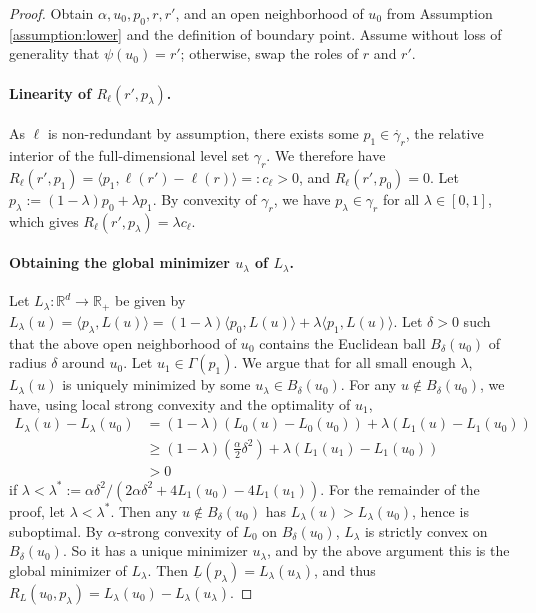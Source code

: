 \documentclass{article}
\theoremstyle{definition}\newtheorem{definition}{Definition}
\theoremstyle{definition}\newtheorem{assumption}{Assumption}
\newcommand{\reals}{\mathbb{R}}
\newcommand{\risk}[1]{\underline{#1}}
\newcommand{\inprod}[2]{\langle #1, #2 \rangle}%
\newcommand{\inter}[1]{\mathring{#1}}%
\begin{document}
\begin{proof}
  Obtain $\alpha, u_0, p_0, r, r'$, and an open neighborhood of $u_0$ from Assumption \ref{assumption:lower} and the definition of boundary point.
  Assume without loss of generality that $\psi(u_0) = r'$; otherwise, swap the roles of $r$ and $r'$.

  \paragraph{Linearity of $R_{\ell}(r',p_{\lambda})$.}
  As $\ell$ is non-redundant by assumption, there exists some $p_1 \in \inter{\gamma_r}$, the relative interior of the full-dimensional level set $\gamma_r$.
  We therefore have $R_\ell(r',p_1) = \inprod{p_1}{\ell(r')-\ell(r)} =: c_\ell > 0$, and $R_\ell(r',p_0) = 0$.
  Let $p_\lambda := (1-\lambda) p_0 + \lambda p_1$.
  By convexity of $\gamma_r$, we have $p_\lambda \in \gamma_r$ for all $\lambda \in [0,1]$, which gives $R_\ell(r',p_\lambda) = \lambda c_\ell$.

  \paragraph{Obtaining the global minimizer $u_{\lambda}$ of $L_{\lambda}$.}
  Let $L_\lambda:\reals^d\to\reals_+$ be given by $L_\lambda(u) = \inprod{p_\lambda}{L(u)} = (1-\lambda) \inprod{p_0}{L(u)} + \lambda \inprod{p_1}{L(u)}$.
  Let $\delta >0$ such that the above open neighborhood of $u_0$ contains the Euclidean ball $B_\delta(u_0)$ of radius $\delta$ around $u_0$.
  Let $u_1 \in \Gamma(p_1)$.
  We argue that for all small enough $\lambda$, $L_{\lambda}(u)$ is uniquely minimized by some $u_{\lambda} \in B_{\delta}(u_0)$.
  For any $u\notin B_\delta(u_0)$, we have, using local strong convexity and the optimality of $u_1$,
  \begin{align*}
    L_\lambda(u) - L_\lambda(u_0)
    &=
      (1-\lambda) \left( L_0(u) - L_0(u_0) \right)
      + \lambda \left( L_1(u) - L_1(u_0) \right)
    \\
    &\geq
      (1-\lambda) \left( \frac \alpha 2 \delta^2 \right)
      + \lambda \left( L_1(u_1) - L_1(u_0) \right)~  \\
    &> 0
  \end{align*}
  if $\lambda < \lambda^* := \alpha \delta^2 / (2 \alpha \delta^2 + 4 L_1(u_0) - 4 L_1(u_1))$.
  For the remainder of the proof, let $\lambda < \lambda^*$.
  Then any $u\notin B_{\delta}(u_0)$ has $L_{\lambda}(u) > L_{\lambda}(u_0)$, hence is suboptimal.
  By $\alpha$-strong convexity of $L_0$ on $B_\delta(u_0)$, $L_\lambda$ is strictly convex on $B_\delta(u_0)$.
  So it has a unique minimizer $u_{\lambda}$, and by the above argument this is the global minimizer of $L_{\lambda}$.
  Then $\risk{L}(p_\lambda) = L_\lambda(u_\lambda)$, and thus $R_L(u_0,p_\lambda) = L_\lambda(u_0) - L_\lambda(u_\lambda)$.


\end{proof}
\end{document}
